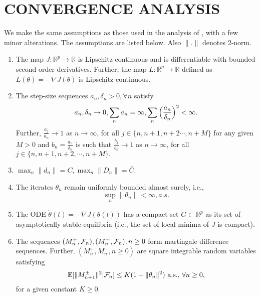 \section{CONVERGENCE ANALYSIS}
\label{sec:convergenceresults}
We make the same assumptions as those used in the analysis of \cite{spall}, with a 
few minor alterations. The assumptions are listed below. Also $\|.\|$ denotes 2-norm.
\begin{enumerate}[label= \textbf{(A\arabic*)}]
 \item The map $J:\mathbb{R}^p \rightarrow \mathbb{R}$ is Lipschitz continuous and 
 is differentiable with bounded second order derivatives. Further, 
 the map $L:\mathbb{R}^p \rightarrow \mathbb{R}$ defined as 
 $L(\theta)=-\nabla J(\theta)$ is Lipschitz continuous.
 \item The step-size sequences $a_n, \delta_n >0, \forall n $  satisfy
 \begin{equation*}\label{stepsizes}
 a_n,\delta_n \rightarrow 0 , \sum_na_n=\infty,
 \sum_n \Big{(}\frac{a_n}{\delta_n}\Big{)}^2<\infty.
 \end{equation*}
 Further, $\frac{a_j}{a_n}\rightarrow 1$ as $n\rightarrow \infty$, for all
 $j \in \{n,n+1,n+2\cdots,n+M\}$ for any given $M>0$ and $b_n=\frac{a_n}{\delta_n}$ is 
 such that $\frac{b_j}{b_n}\rightarrow 1$ as $n\rightarrow \infty$, for all
 $j \in \{n,n+1,n+2,\cdots,n+M\}.$

 \item $\max_n \|d_n\|= C, \max_n \|D_n\|= \bar{C}$. 
 
 \item The iterates $\theta_n$ remain uniformly bounded almost surely, i.e.,
 $$ \sup_n\|\theta_n\|<\infty, a.s.$$

 \item The ODE $\dot{\theta}(t)=-\nabla J(\theta(t))$ has a compact set 
 $G \subset \mathbb{R}^p$ as its set of asymptotically stable equilibria
 (i.e., the set of local minima of $J$ is compact).
 
 
 \item The sequences $(M_{n}^{+},\mathcal{F}_n),(M_{n}^{-},\mathcal{F}_n), n\geq0 $ form martingale difference sequences.
 Further, $(M_{n}^{+},M_{n}^{-},n\geq0)$ are square integrable random variables satisfying
 $$\mathbb{E}[\|M_{n+1}^{\pm}\|^2|\mathcal{F}_n]\leq K(1+\|\theta_n\|^2) \text{ a.s., } \forall n\geq0,$$
 for a given constant $K \geq 0.$
 
\end{enumerate}
